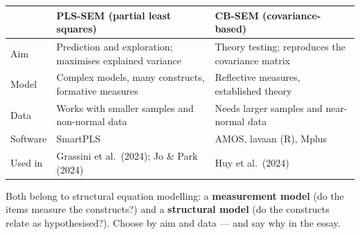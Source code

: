 \documentclass[11pt,a4paper,british,twoside=false,headings=small,chapterprefix=false,numbers=noenddot]{scrbook}
\begin{document}
\begin{center}\small
\small
  \renewcommand{\arraystretch}{1.3}
  \begin{tabular}{@{}p{3.0cm}p{5.0cm}p{5.0cm}@{}}
    \toprule
    & \textbf{PLS-SEM (partial least squares)} & \textbf{CB-SEM (covariance-based)}\\
    \midrule
    Aim & Prediction and exploration; maximises explained variance & Theory testing; reproduces the covariance matrix\\
    Model & Complex models, many constructs, formative measures & Reflective measures, established theory\\
    Data & Works with smaller samples and non-normal data & Needs larger samples and near-normal data\\
    Software & SmartPLS & AMOS, lavaan (R), Mplus\\
    Used in & Grassini et al.\ (2024); Jo \& Park (2024) & Huy et al.\ (2024)\\
    \bottomrule
  \end{tabular}
  

  Both belong to structural equation modelling: a \textbf{measurement model}
  (do the items measure the constructs?) and a \textbf{structural model} (do
  the constructs relate as hypothesised?). Choose by aim and data --- and say
  why in the essay.
\end{center}
\end{document}
